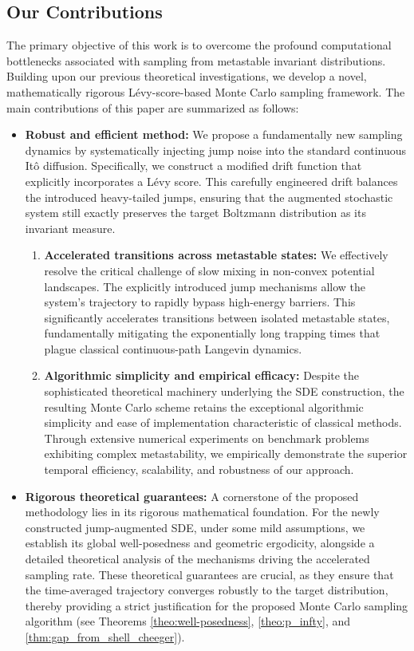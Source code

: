 \subsection*{Our Contributions}
The primary objective of this work is to overcome the profound computational bottlenecks associated with sampling from metastable invariant distributions. Building upon our previous theoretical investigations, we develop a novel, mathematically rigorous L\'{e}vy-score-based Monte Carlo sampling framework. The main contributions of this paper are summarized as follows:

\begin{itemize}
    \item \textbf{Robust and efficient method:} We propose a fundamentally new sampling dynamics by systematically injecting jump noise into the standard continuous It\^{o} diffusion. Specifically, we construct a modified drift function that explicitly incorporates a L\'{e}vy score. This carefully engineered drift balances the introduced heavy-tailed jumps, ensuring that the augmented stochastic system still exactly preserves the target Boltzmann distribution as its invariant measure.
    \begin{enumerate}
        \item \textbf{Accelerated transitions across metastable states:} We effectively resolve the critical challenge of slow mixing in non-convex potential landscapes. The explicitly introduced jump mechanisms allow the system's trajectory to rapidly bypass high-energy barriers. This significantly accelerates transitions between isolated metastable states, fundamentally mitigating the exponentially long trapping times that plague classical continuous-path Langevin dynamics.
    
    \item \textbf{Algorithmic simplicity and empirical efficacy:} Despite the sophisticated theoretical machinery underlying the SDE construction, the resulting Monte Carlo scheme retains the exceptional algorithmic simplicity and ease of implementation characteristic of classical methods. Through extensive numerical experiments on benchmark problems exhibiting complex metastability, we empirically demonstrate the superior temporal efficiency, scalability, and robustness of our approach.
    \end{enumerate}
    
    \item \textbf{Rigorous theoretical guarantees:} A cornerstone of the proposed methodology lies in its rigorous mathematical foundation. For the newly constructed jump-augmented SDE, under some mild assumptions, we establish its global well-posedness and geometric ergodicity, alongside a detailed theoretical analysis of the mechanisms driving the accelerated sampling rate. These theoretical guarantees are crucial, as they ensure that the time-averaged trajectory converges robustly to the target distribution, thereby providing a strict justification for the proposed Monte Carlo sampling algorithm (see Theorems \ref{theo:well-posedness}, \ref{theo:p_infty}, and \ref{thm:gap_from_shell_cheeger}).
    

\end{itemize}
